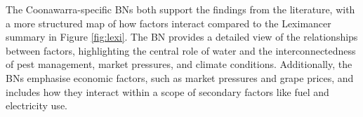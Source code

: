 The Coonawarra-specific BNs both support the findings from the literature, with a more structured map of how factors interact compared to the Leximancer summary in Figure \ref{fig:lexi}. The BN provides a detailed view of the relationships between factors, highlighting the central role of water and the interconnectedness of pest management, market pressures, and climate conditions. Additionally, the BNs emphasise economic factors, such as market pressures and grape prices, and includes how they interact within a scope of secondary factors like fuel and electricity use.










